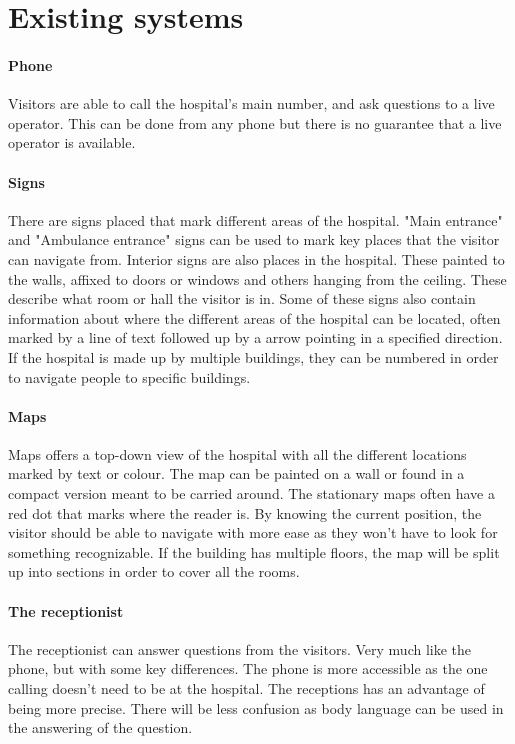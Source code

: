 \section{Existing systems} %
\label{sec:existing_systems}


\paragraph{Phone}
Visitors are able to call the hospital's main number, and ask questions to a live operator. This can be done from any phone but there is no guarantee that a live operator is available.

\paragraph{Signs}
There are signs placed that mark different areas of the hospital. "Main entrance" and "Ambulance entrance" signs can be used to mark key places that the visitor can navigate from\cite{art_Osborne}.
Interior signs are also places in the hospital. These painted to the walls, affixed to doors or windows and others hanging from the ceiling. These describe what room or hall the visitor is in. Some of these signs also contain information about where the different areas of the hospital can be located, often marked by a line of text followed up by a arrow pointing in a specified direction. If the hospital is made up by multiple buildings, they can be numbered in order to navigate people to specific buildings.

\paragraph{Maps}
Maps offers a top-down view of the hospital with all the different locations marked by text or colour\cite{art_Osborne}. The map can be painted on a wall or found in a compact version meant to be carried around. The stationary maps often have a red dot that marks where the reader is. By knowing the current position, the visitor should be able to navigate with more ease as they won't have to look for something recognizable. If the building has multiple floors, the map will be split up into sections in order to cover all the rooms.

\paragraph{The receptionist}
The receptionist can answer questions from the visitors. Very much like the phone, but with some key differences. The phone is more accessible as the one calling doesn't need to be at the hospital. The receptions has an advantage of being more precise. There will be less confusion as body language can be used in the answering of the question.

